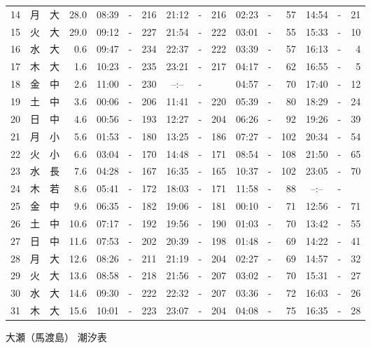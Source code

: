 \documentclass[12pt.a4j]{jsarticle}
\begin{document}
\begin{center}
\begin{table}[ht]
\begin{tabular}{|rc|cr|ccrccr|ccrccr|}
14 & 月 & 大 & 28.0 &  08:39 &-& 216  &  21:12 &-& 216  &   02:23 &-&  57  &   14:54 &-&  21  \\
15 & 火 & 大 & 29.0 &  09:12 &-& 227  &  21:54 &-& 222  &   03:01 &-&  55  &   15:33 &-&  10  \\
16 & 水 & 大 &  0.6 &  09:47 &-& 234  &  22:37 &-& 222  &   03:39 &-&  57  &   16:13 &-&   4  \\
17 & 木 & 大 &  1.6 &  10:23 &-& 235  &  23:21 &-& 217  &   04:17 &-&  62  &   16:55 &-&   5  \\
18 & 金 & 中 &  2.6 &  11:00 &-& 230  &  --:-- &-&     &   04:57 &-&  70  &   17:40 &-&  12  \\
19 & 土 & 中 &  3.6 &  00:06 &-& 206  &  11:41 &-& 220  &   05:39 &-&  80  &   18:29 &-&  24  \\
20 & 日 & 中 &  4.6 &  00:56 &-& 193  &  12:27 &-& 204  &   06:26 &-&  92  &   19:26 &-&  39  \\
21 & 月 & 小 &  5.6 &  01:53 &-& 180  &  13:25 &-& 186  &   07:27 &-& 102  &   20:34 &-&  54  \\
22 & 火 & 小 &  6.6 &  03:04 &-& 170  &  14:48 &-& 171  &   08:54 &-& 108  &   21:50 &-&  65  \\
23 & 水 & 長 &  7.6 &  04:28 &-& 167  &  16:35 &-& 165  &   10:37 &-& 102  &   23:05 &-&  70  \\
24 & 木 & 若 &  8.6 &  05:41 &-& 172  &  18:03 &-& 171  &   11:58 &-&  88  &   --:-- &-&     \\
25 & 金 & 中 &  9.6 &  06:35 &-& 182  &  19:06 &-& 181  &   00:10 &-&  71  &   12:56 &-&  71  \\
26 & 土 & 中 & 10.6 &  07:17 &-& 192  &  19:56 &-& 190  &   01:03 &-&  70  &   13:42 &-&  55  \\
27 & 日 & 中 & 11.6 &  07:53 &-& 202  &  20:39 &-& 198  &   01:48 &-&  69  &   14:22 &-&  41  \\
28 & 月 & 大 & 12.6 &  08:26 &-& 211  &  21:19 &-& 204  &   02:27 &-&  69  &   14:57 &-&  32  \\
29 & 火 & 大 & 13.6 &  08:58 &-& 218  &  21:56 &-& 207  &   03:02 &-&  70  &   15:31 &-&  27  \\
30 & 水 & 大 & 14.6 &  09:30 &-& 222  &  22:32 &-& 207  &   03:36 &-&  72  &   16:03 &-&  26  \\
31 & 木 & 大 & 15.6 &  10:01 &-& 223  &  23:07 &-& 204  &   04:08 &-&  75  &   16:35 &-&  28  \\
   \hline
   \end{tabular}
\end{table}
\newpage
 {\LARGE 大瀬（馬渡島）  潮汐表　　　}

\end{center}
\end{document}
